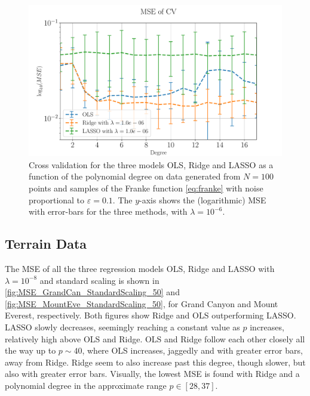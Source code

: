 \documentclass[%
reprint,
amsmath,amssymb,
aps,
pra,
]{revtex4-2}
\begin{document}
\begin{figure}[ht!]
	\centering
	\includegraphics[width=\linewidth]{Python/Figures/CV/CV_no_scaling.pdf}
	\caption{Cross validation for the three models OLS, Ridge and LASSO as a function of the polynomial degree on data generated from \(N=100\) points and samples of the Franke function \eqref{eq:franke} with noise proportional to \(\varepsilon=0.1\). The $y$-axis shows the (logarithmic) MSE with error-bars for the three methods, with \(\lambda=10^{-6}\). }
	\label{fig:CV}
\end{figure}

\subsection{Terrain Data}
The MSE of all the three regression models OLS, Ridge and LASSO with \(\lambda=10^{-8}\) and standard scaling is shown in \ref{fig:MSE_GrandCan_StandardScaling_50} and \ref{fig:MSE_MountEve_StandardScaling_50}, for Grand Canyon and Mount Everest, respectively. 
Both figures show Ridge and OLS outperforming LASSO. LASSO slowly decreases, seemingly reaching a constant value as \(p\) increases, relatively high above OLS and Ridge. OLS and Ridge follow each other closely all the way up to \(p\sim 40\), where OLS increases, jaggedly and with greater error bars, away from Ridge. Ridge seem to also increase past this degree, though slower, but also with greater error bars. Visually, the lowest MSE is found with Ridge and a polynomial degree in the approximate range \(p\in[28,37]\). 
\end{document}
